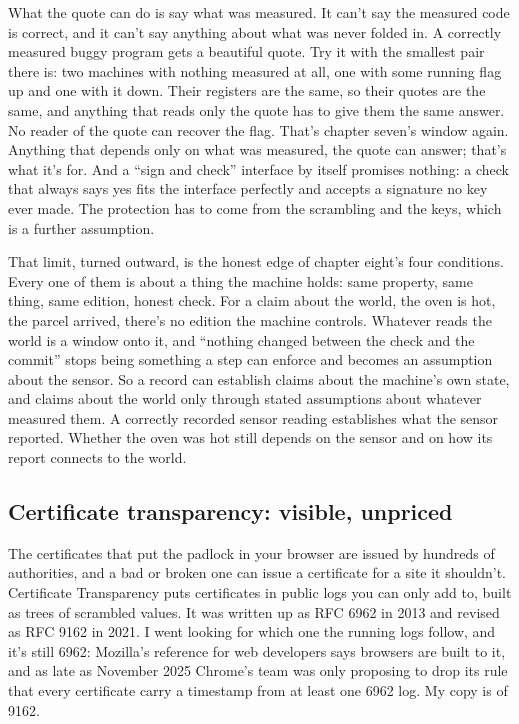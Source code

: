 \documentclass[11pt,twoside]{article}
\theoremstyle{thielethm}
\theoremstyle{thieledef}
\theoremstyle{thieledef}
\theoremstyle{thieledef}
\theoremstyle{thielethm}
\theoremstyle{thieleobs}
\theoremstyle{thielethm}
\begin{document}
What the quote can do is say what was measured. It can't say the measured code is correct, and it can't say anything about what was never folded in. A correctly measured buggy program gets a beautiful quote. Try it with the smallest pair there is: two machines with nothing measured at all, one with some running flag up and one with it down. Their registers are the same, so their quotes are the same, and anything that reads only the quote has to give them the same answer. No reader of the quote can recover the flag. That's chapter seven's window again. Anything that depends only on what was measured, the quote can answer; that's what it's for. And a ``sign and check'' interface by itself promises nothing: a check that always says yes fits the interface perfectly and accepts a signature no key ever made. The protection has to come from the scrambling and the keys, which is a further assumption.

That limit, turned outward, is the honest edge of chapter eight's four conditions. Every one of them is about a thing the machine holds: same property, same thing, same edition, honest check. For a claim about the world, the oven is hot, the parcel arrived, there's no edition the machine controls. Whatever reads the world is a window onto it, and ``nothing changed between the check and the commit'' stops being something a step can enforce and becomes an assumption about the sensor. So a record can establish claims about the machine's own state, and claims about the world only through stated assumptions about whatever measured them. A correctly recorded sensor reading establishes what the sensor reported. Whether the oven was hot still depends on the sensor and on how its report connects to the world.

\subsection{Certificate transparency: visible, unpriced}

The certificates that put the padlock in your browser are issued by hundreds of authorities, and a bad or broken one can issue a certificate for a site it shouldn't. Certificate Transparency puts certificates in public logs you can only add to, built as trees of scrambled values. It was written up as RFC 6962 in 2013 and revised as RFC 9162 in 2021. I went looking for which one the running logs follow, and it's still 6962: Mozilla's reference for web developers says browsers are built to it, and as late as November 2025 Chrome's team was only proposing to drop its rule that every certificate carry a timestamp from at least one 6962 log. My copy is of 9162.
\end{document}
